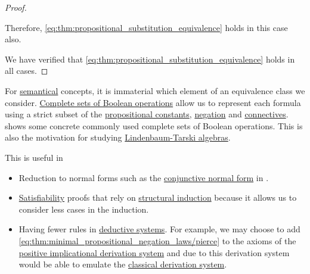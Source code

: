 \begin{proof}
\begin{itemize}
    Therefore, \eqref{eq:thm:propositional_substitution_equivalence} holds in this case also.
  \end{itemize}

  We have verified that \eqref{eq:thm:propositional_substitution_equivalence} holds in all cases.
\end{proof}

\begin{remark}\label{rem:smaller_propositional_language}
  For \hyperref[def:propositional_semantics]{semantical} concepts, it is immaterial which element of an equivalence class we consider. \hyperref[def:boolean_closure]{Complete sets of Boolean operations} allow us to represent each formula using a strict subset of the \hyperref[def:propositional_language/constants]{propositional constants}, \hyperref[def:propositional_language/negation]{negation} and \hyperref[def:propositional_language/connectives]{connectives}.  shows some concrete commonly used complete sets of Boolean operations. This is also the motivation for studying \hyperref[def:lindenbaum_tarski_algebra]{Lindenbaum-Tarski algebras}.

  This is useful in
  \begin{itemize}
    \item Reduction to normal forms such as the \hyperref[def:conjunctive_disjunctive_normal_form]{conjunctive normal form} in .

    \item \hyperref[def:propositional_semantics/satisfiability]{Satisfiability} proofs that rely on \hyperref[rem:structural_recursion_and_induction]{structural induction} because it allows us to consider less cases in the induction.

    \item Having fewer rules in \hyperref[alg:conjunctive_normal_form_reduction]{deductive systems}. For example, we may choose to add \eqref{eq:thm:minimal_propositional_negation_laws/pierce} to the axioms of the \hyperref[def:positive_implicational_deductive_system]{positive implicational derivation system} and due to  this derivation system would be able to emulate the \hyperref[def:classical_propositional_deductive_systems]{classical derivation system}.
  \end{itemize}
\end{remark}

